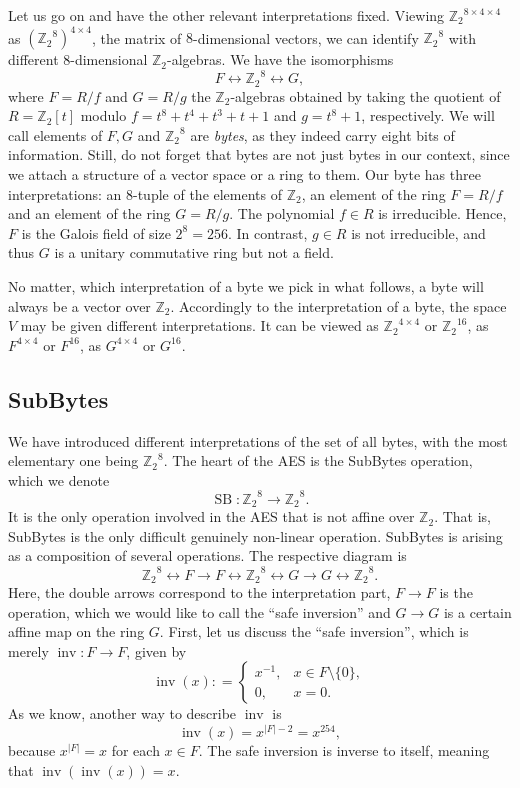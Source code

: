 \documentclass[11pt,a4paper]{amsart}
\newcommand{\SB}{\operatorname{SB}}
\newcommand{\Z}{\mathbb{Z}}
\newcommand{\inv}{\operatorname{inv}}
\begin{document}
Let us go on and have the other relevant interpretations fixed. Viewing ${\Z_2}^{8 \times 4 \times 4}$ as $( {\Z_2}^8) ^{4 \times 4}$, the matrix of $8$-dimensional vectors, we can identify ${\Z_2}^8$ with different $8$-dimensional $\Z_2$-algebras. We have the isomorphisms 
\[
		F \longleftrightarrow {\Z_2}^8 \longleftrightarrow G,
\]
where $ F = R / f$ and $G = R / g$ the $\Z_2$-algebras obtained by taking the quotient of $R = \Z_2[t]$ modulo $f = t^8 + t^4 + t^3 + t + 1$ and $g = t^8+1$, respectively.  We will call elements of $F, G$ and ${\Z_2}^8$ are \emph{bytes}, as they indeed carry eight bits of information. Still, do not forget that bytes are not just bytes in our context, since we attach a structure of a vector space or a ring to them. Our byte has three interpretations: an $8$-tuple of the elements of $\Z_2$, an element of the ring $F = R / f$ and an element of the ring $G = R / g$. The polynomial $f \in R$ is irreducible. Hence, $F$ is the Galois field of size $2^8 = 256$. In contrast, $g \in R$ is not irreducible, and thus $G$ is a unitary commutative ring but not a field. 

No matter, which interpretation of a byte we pick in what follows, a byte will always be a vector over $\Z_2$. Accordingly to the interpretation of a byte, the space $V$ may be given different interpretations. It can be viewed as ${\Z_2}^{4 \times 4}$ or ${\Z_2}^{16}$, as $F^{4 \times 4}$ or $F^{16}$, as $G^{4 \times 4}$ or $G^{16}$. 

\subsection*{SubBytes} We have introduced different interpretations of the set of all bytes, with the most elementary one being ${\Z_2}^8$. The heart of the AES is the SubBytes operation, which we denote 
\[
	\SB : {\Z_2}^8 \to {\Z_2}^8.
\]
It is the only operation involved in the AES that is not affine over $\Z_2$. That is, SubBytes is the only difficult genuinely non-linear operation. SubBytes is arising as a composition of several operations. The respective diagram is 
\[
	{\Z_2}^8 \longleftrightarrow F \longrightarrow F \longleftrightarrow {\Z_2}^8 \longleftrightarrow G \longrightarrow G \longleftrightarrow {\Z_2}^8. 
\]  
Here, the double arrows correspond to the interpretation part, $F \to F$ is the operation, which we would like to call the ``safe inversion'' and $G \to G$ is a certain affine map on the ring $G$. First, let us discuss the ``safe inversion'', which is merely $\inv : F \to F$, given by 
\[
	\inv(x) : = 
	\begin{cases} 
	x^{-1}, &  x \in F \setminus \{0\}, 
\\	0, & x = 0. 
	\end{cases} 
\]
As we know, another way to describe $\inv$ is 
\[
	\inv(x) = x^{|F|-2} = x^{254}, 
\]
because $x^{|F|} = x$ for each $x \in F$. The safe inversion is inverse to itself, meaning that $\inv(\inv(x))=x$. 
\end{document}
